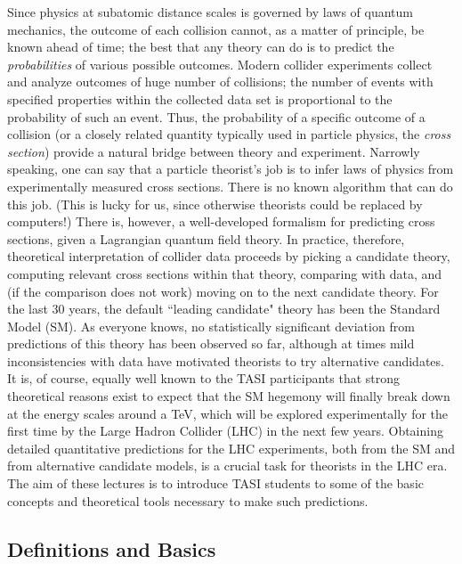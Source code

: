 \documentclass{ws-procs9x6}
\begin{document}
Since physics at subatomic distance scales is governed by laws of quantum mechanics, the outcome of each collision cannot, as a matter of principle, be known ahead of time; the best that any theory can do is to predict the {\it probabilities} of various possible outcomes. 
Modern collider experiments collect and analyze outcomes of huge number of collisions; the number of events with specified properties within the collected data set is proportional to the probability of such an event. Thus, the probability of a specific outcome of a collision (or a closely related quantity typically used in particle physics, the {\it cross section}) provide a natural bridge between theory and experiment. Narrowly speaking, one can say that a particle theorist's job is to infer laws of physics from experimentally measured cross sections. There is no known algorithm that can do this job. (This is lucky for us, since otherwise theorists could be replaced by computers!) There is, however, a well-developed formalism for predicting cross sections, given a Lagrangian quantum field theory. In practice, therefore, theoretical interpretation of collider data proceeds by picking a candidate theory, computing relevant cross sections within that theory, comparing with data, and (if the comparison does not work) moving on to the next candidate theory. For the last 30 years, the default ``leading candidate" theory has been the Standard Model (SM). As everyone knows, no statistically significant deviation from predictions of this theory  
has been observed so far, although at times mild inconsistencies with data have motivated theorists to try alternative candidates. It is, of course, equally well known to the TASI participants that strong theoretical reasons exist to expect that the SM hegemony will finally break down at the energy scales around a TeV, which will be explored experimentally for the first time by the Large Hadron Collider  
(LHC) in the next few years. Obtaining detailed quantitative predictions for the LHC experiments, both from the SM and from alternative candidate models, is a crucial task for theorists in the LHC era. The aim of these lectures is to introduce TASI students to some of the basic concepts and theoretical tools necessary to make such predictions. 


\subsection{Definitions and Basics} 
\end{document}
